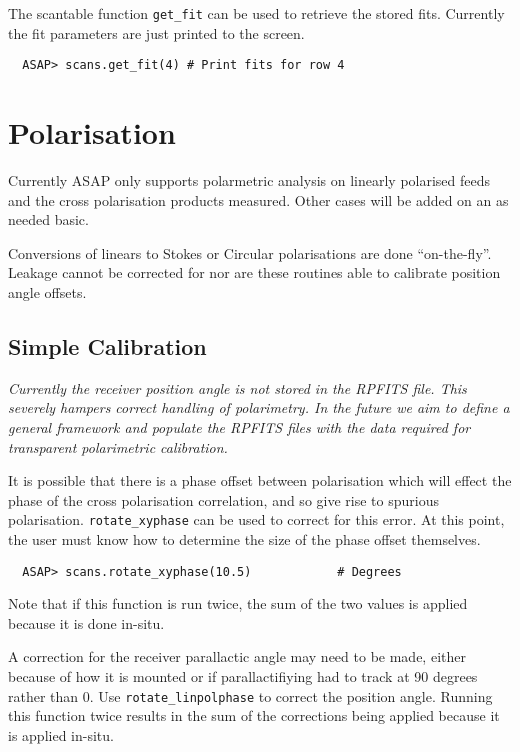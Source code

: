 \documentclass[11pt]{article}
\newcommand{\cmd}[1]{{\tt #1}}
\begin{document}
The scantable function \cmd{get\_fit} can be used to retrieve the
stored fits. Currently the fit parameters are just printed to the
screen.

\begin{verbatim}
  ASAP> scans.get_fit(4) # Print fits for row 4
\end{verbatim}

\section{Polarisation}

Currently ASAP only supports polarmetric analysis on linearly
polarised feeds and the cross polarisation products measured. Other
cases will be added on an as needed basic.

Conversions of linears to Stokes or Circular polarisations are done
``on-the-fly''. Leakage cannot be corrected for nor are these routines
able to calibrate position angle offsets. 

\subsection{Simple Calibration}

{\em Currently the receiver position angle is not stored in the RPFITS
file. This severely hampers correct handling of polarimetry. In the future
we aim to define a general framework and populate the RPFITS files
with the data required for transparent polarimetric calibration.}

It is possible that there is a phase offset between polarisation which
will effect the phase of the cross polarisation correlation, and so give
rise to spurious polarisation. \cmd{rotate\_xyphase} can be used to
correct for this error. At this point, the user must know how to
determine the size of the phase offset themselves.

\begin{verbatim}
  ASAP> scans.rotate_xyphase(10.5)            # Degrees
\end{verbatim}

Note that if this function is run twice, the sum of the two values is
applied because it is done in-situ.

A correction for the receiver parallactic angle may need to be made,
either because of how it is mounted or if parallactifiying had to track
at 90 degrees rather than 0. Use \cmd{rotate\_linpolphase} to correct
the position angle. Running this function twice results in the sum of
the corrections being applied because it is applied in-situ.
\end{document}
